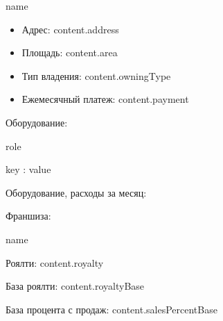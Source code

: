\documentclass[a4paper,12pt]{article}
\begin{document}
{{{{{{{{{{{{{{{%
  {%
    {{ name }}

    \begin{itemize}
    \item Адрес: {{ content.address }}
    \item Площадь: {{ content.area }}
    \item Тип владения: {{ content.owningType }}
    \item Ежемесячный платеж: {{ content.payment }}
    \end{itemize}
    {%
    Оборудование:
    {%
    {%
      {%
      {{ role }}
        {%
        {%
        {{ key }}: {{ value }}

        {%
        {%
      {%
    {%

    {%
    Оборудование, расходы за месяц:

    {%
  {%
{%

{%
Франшиза:
  {%
      {{ name }}

      Роялти: {{ content.royalty }}
      
      База роялти: {{ content.royaltyBase }}
      
      База процента с продаж: {{ content.salesPercentBase }}

}}}}}}}}}}}}}}}}}}}}}}}}}}}}}}}}
\end{document}
